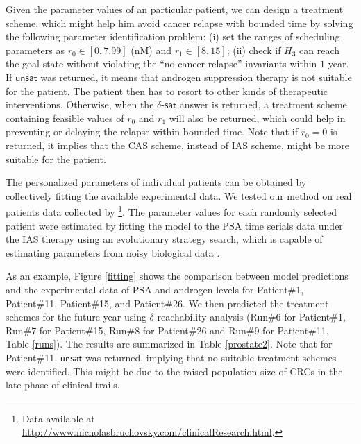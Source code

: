 Given the parameter values of an particular patient, we can design a treatment scheme, which might help him avoid cancer relapse with bounded time by solving the following parameter identification problem: (i) set the ranges of scheduling parameters as $r_0 \in [0,7.99]$ (nM) and $r_1 \in [8,15]$; (ii) check if $H_3$ can reach the goal state without violating the ``no cancer relapse'' invariants within $1$ year. If $\mathsf{unsat}$ was returned, it means that androgen suppression therapy is not suitable for the patient. The patient then has to resort to other kinds of therapeutic interventions. Otherwise, when the $\delta$-$\mathsf{sat}$ answer is returned, a treatment scheme containing feasible values of $r_0$ and $r_1$ will also be returned, which could help in preventing or delaying the relapse within bounded time. Note that if $r_0=0$ is returned, it implies that the CAS scheme, instead of IAS scheme, might be more suitable for the patient.

The personalized parameters of individual patients can be obtained by collectively fitting the available experimental data. We tested our method on real patients data collected by \cite{bruchovsky07}\footnote{Data available at \url{http://www.nicholasbruchovsky.com/clinicalResearch.html}.}. The parameter values for each randomly selected patient were estimated by fitting the model to the PSA time serials data under the IAS therapy using an evolutionary strategy search, which is capable of estimating parameters from noisy biological data \cite{moles03}.

As an example, Figure \ref{fitting} shows the comparison between model predictions and the experimental data of PSA and androgen levels for Patient\#1, Patient\#11, Patient\#15, and Patient\#26. We then predicted the treatment schemes for the future year using $\delta$-reachability analysis (Run\#6 for Patient\#1, Run\#7 for Patient\#15, Run\#8 for Patient\#26 and Run\#9 for Patient\#11, Table \ref{runs}). The results are summarized in Table \ref{prostate2}. Note that for Patient\#11, $\mathsf{unsat}$ was returned, implying that no suitable treatment schemes were identified. This might be due to the raised population size of CRCs in the late phase of clinical trails. 

